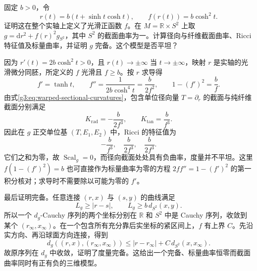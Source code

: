 \begin{exercise}\label{g3:ex:scalar-flat-warped-model}
	固定 \(b>0\)，令
	\[
		r(t)=b(t+\sinh t\cosh t),\qquad f(r(t))=b\cosh^2t.
	\]
	证明这在整个实轴上定义了光滑正函数 \(f\)。在 \(M=\mathbb R\times S^2\) 上取 \(g=\mathrm dr^2+f(r)^2g_{S^2}\)，其中 \(S^2\) 的截面曲率为一。计算径向与纤维截面曲率、Ricci 特征值及标量曲率，并证明 \(g\) 完备。这个模型是否平坦？
\end{exercise}
\begin{solution}
	因为 \(r'(t)=2b\cosh^2t>0\)，且 \(r(t)\to\pm\infty\) 当 \(t\to\pm\infty\)，映射 \(r\) 是实轴的光滑微分同胚，所定义的 \(f\) 光滑且 \(f\ge b\)。按 \(r\) 求导得
	\[
		f'=\tanh t,\qquad
		f''=\frac{1}{2b\cosh^4t}=\frac{b}{2f^2},\qquad
		1-(f')^2=\frac bf.
	\]
	由式\eqref{g3:eq:warped-sectional-curvatures}，包含单位径向量 \(T=\partial_r\) 的截面与纯纤维截面分别满足
	\[
		K_{\mathrm{rad}}=-\frac{b}{2f^3},\qquad
		K_{\mathrm{tan}}=\frac{b}{f^3}.
	\]
	因此在 \(g\) 正交单位基 \((T,E_1,E_2)\) 中，Ricci 的特征值为
	\[
		-\frac{b}{f^3},\quad \frac{b}{2f^3},\quad \frac{b}{2f^3}.
	\]
	它们之和为零，故 \(\operatorname{Scal}_g=0\)，而径向截面处处具有负曲率，度量并不平坦。这里 \(f(1-(f')^2)=b\) 也可直接作为标量曲率为零的方程 \(2ff''=1-(f')^2\) 的第一积分核对；求导时不需要除以可能为零的 \(f'\)。

	最后证明完备。任意连接 \((r,x)\) 与 \((s,y)\) 的曲线满足
	\[
		L_g\ge |r-s|,\qquad L_g\ge b\,d_{S^2}(x,y).
	\]
	所以一个 \(d_g\)-Cauchy 序列的两个坐标分别在 \(\mathbb R\) 和 \(S^2\) 中是 Cauchy 序列，收敛到某个 \((r_\infty,x_\infty)\)。在一个包含所有充分靠后实坐标的紧区间上，\(f\) 有上界 \(C\)。先沿实方向、再沿球面方向连接，得到
	\[
		d_g((r,x),(r_\infty,x_\infty))
		\le |r-r_\infty|+C\,d_{S^2}(x,x_\infty).
	\]
	故原序列在 \(d_g\) 中收敛，证明了度量完备。这给出一个完备、标量曲率恒零而截面曲率同时有正有负的三维模型。
\end{solution}

